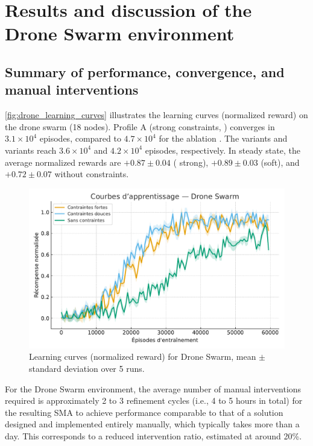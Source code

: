 \section{Results and discussion of the Drone Swarm environment}\label{sec:results_and_discussion_drone_swarm}

\subsection*{Summary of performance, convergence, and manual interventions}

\autoref{fig:drone_learning_curves} illustrates the learning curves (normalized reward) on the drone swarm (18 nodes).
Profile A (strong constraints, ) converges in $3.1\times 10^4$ episodes, compared to $4.7\times 10^4$ for the ablation .
The variants  and  variants reach $3.6\times 10^4$ and $4.2\times 10^4$ episodes, respectively.
In steady state, the average normalized rewards are $+0.87 \pm 0.04$ ( strong), $+0.89 \pm 0.03$ (soft), and $+0.72 \pm 0.07$ without constraints.

\begin{figure}[h!]
  \centering
  \includegraphics[width=0.75\linewidth]{figures/results_drone_learning.pdf}
  \caption[Learning curves (normalized reward) for Drone Swarm]{Learning curves (normalized reward) for Drone Swarm, mean $\pm$ standard deviation over 5 runs.}
  \label{fig:drone_learning_curves}
\end{figure}

For the Drone Swarm environment, the average number of manual interventions required is approximately 2 to 3 refinement cycles (i.e., 4 to 5 hours in total) for the resulting SMA to achieve performance comparable to that of a solution designed and implemented entirely manually, which typically takes more than a day. This corresponds to a reduced intervention ratio, estimated at around 20\%.


